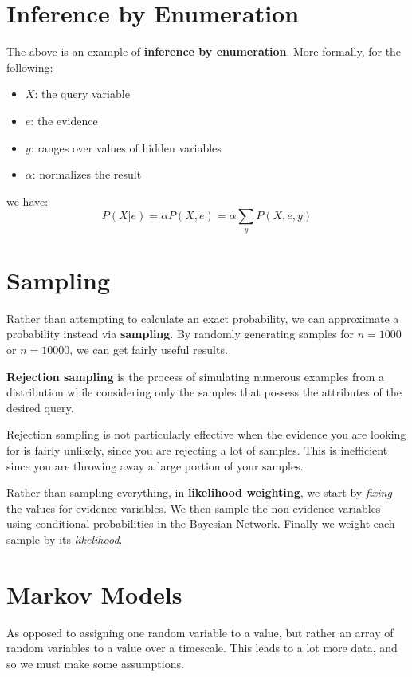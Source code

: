 \section{Inference by Enumeration}
The above is an example of \textbf{inference by enumeration}. More formally, for the following:
\begin{itemize}
	\item \(X\): the query variable
	\item \(e\): the evidence
	\item \(y\): ranges over values of hidden variables
	\item \(\alpha \): normalizes the result
\end{itemize} 
we have:
\[
	P(X | e) = \alpha P(X, e) = \alpha \sum_{y} P(X, e, y)
\]

\section{Sampling}
Rather than attempting to calculate an exact probability, we can approximate a probability instead via \textbf{sampling}. By randomly generating samples for \(n = 1000\) or \(n=10000\), we can get fairly useful results. 

\begin{definition}
	\textbf{Rejection sampling} is the process of simulating numerous examples from a distribution while considering only the samples that possess the attributes of the desired query. 
\end{definition}
\begin{remark}
	Rejection sampling is not particularly effective when the evidence you are looking for is fairly unlikely, since you are rejecting a lot of samples. This is inefficient since you are throwing away a large portion of your samples.
\end{remark}

\begin{definition}
	Rather than sampling everything, in \textbf{likelihood weighting}, we start by \emph{fixing} the values for evidence variables. We then sample the non-evidence variables using conditional probabilities in the Bayesian Network. Finally we weight each sample by its \emph{likelihood}.
\end{definition}

\section{Markov Models}
As opposed to assigning one random variable to a value, but rather an array of random variables to a value over a timescale. This leads to a lot more data, and so we must make some assumptions.

